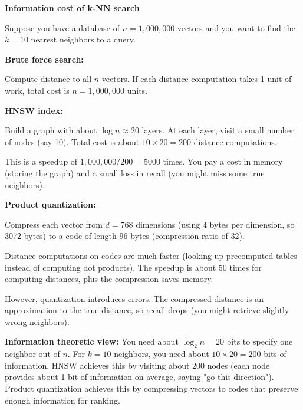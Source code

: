 \begin{examplebox}
\textbf{Information cost of k-NN search}

\vspace{0.5em}

Suppose you have a database of $n = 1{,}000{,}000$ vectors and you want to find the $k = 10$ nearest neighbors to a query.

\vspace{0.5em}

\textbf{Brute force search:}

Compute distance to all $n$ vectors. If each distance computation takes 1 unit of work, total cost is $n = 1{,}000{,}000$ units.

\vspace{0.5em}

\textbf{HNSW index:}

Build a graph with about $\log n \approx 20$ layers. At each layer, visit a small number of nodes (say 10). Total cost is about $10 \times 20 = 200$ distance computations.

This is a speedup of $1{,}000{,}000 / 200 = 5000$ times. You pay a cost in memory (storing the graph) and a small loss in recall (you might miss some true neighbors).

\vspace{0.5em}

\textbf{Product quantization:}

Compress each vector from $d = 768$ dimensions (using 4 bytes per dimension, so 3072 bytes) to a code of length 96 bytes (compression ratio of 32).

Distance computations on codes are much faster (looking up precomputed tables instead of computing dot products). The speedup is about 50 times for computing distances, plus the compression saves memory.

However, quantization introduces errors. The compressed distance is an approximation to the true distance, so recall drops (you might retrieve slightly wrong neighbors).

\vspace{0.5em}

\textbf{Information theoretic view:} You need about $\log_2 n = 20$ bits to specify one neighbor out of $n$. For $k = 10$ neighbors, you need about $10 \times 20 = 200$ bits of information. HNSW achieves this by visiting about 200 nodes (each node provides about 1 bit of information on average, saying "go this direction"). Product quantization achieves this by compressing vectors to codes that preserve enough information for ranking.
\end{examplebox}

